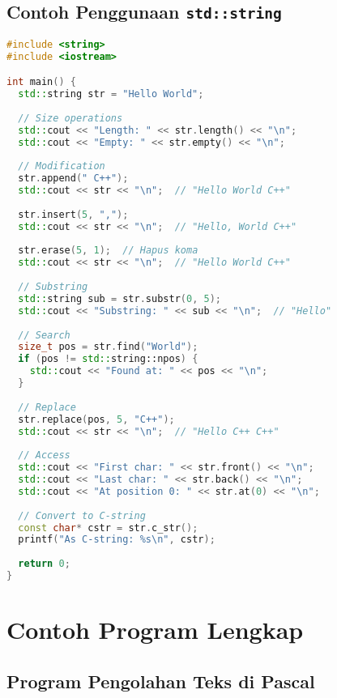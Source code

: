 \documentclass[../main.tex]{subfiles}
\begin{document}
\subsection{Contoh Penggunaan \texttt{std::string}}

\begin{lstlisting}[language=C++, caption={Contoh metode std::string}]
#include <string>
#include <iostream>

int main() {
  std::string str = "Hello World";
  
  // Size operations
  std::cout << "Length: " << str.length() << "\n";
  std::cout << "Empty: " << str.empty() << "\n";
  
  // Modification
  str.append(" C++");
  std::cout << str << "\n";  // "Hello World C++"
  
  str.insert(5, ",");
  std::cout << str << "\n";  // "Hello, World C++"
  
  str.erase(5, 1);  // Hapus koma
  std::cout << str << "\n";  // "Hello World C++"
  
  // Substring
  std::string sub = str.substr(0, 5);
  std::cout << "Substring: " << sub << "\n";  // "Hello"
  
  // Search
  size_t pos = str.find("World");
  if (pos != std::string::npos) {
    std::cout << "Found at: " << pos << "\n";
  }
  
  // Replace
  str.replace(pos, 5, "C++");
  std::cout << str << "\n";  // "Hello C++ C++"
  
  // Access
  std::cout << "First char: " << str.front() << "\n";
  std::cout << "Last char: " << str.back() << "\n";
  std::cout << "At position 0: " << str.at(0) << "\n";
  
  // Convert to C-string
  const char* cstr = str.c_str();
  printf("As C-string: %s\n", cstr);
  
  return 0;
}
\end{lstlisting}

\section{Contoh Program Lengkap}

\subsection{Program Pengolahan Teks di Pascal}
\end{document}
